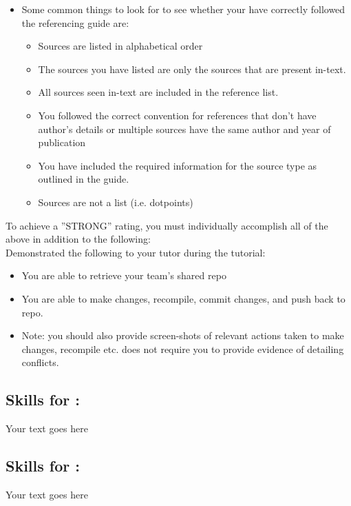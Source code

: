 \documentclass[a4paper, 11pt]{report}
\begin{document}
\begin{itemize}
\begin{itemize}
	\item Some common things to look for to see whether your have correctly followed the referencing guide are:
		\begin{itemize}
		\item Sources are listed in alphabetical order
		\item The sources you have listed are only the sources that are present in-text.
		\item All sources seen in-text are included in the reference list.
		\item You followed the correct convention for references that don’t have author’s details or multiple sources have the same author and year of publication
		\item You have included the required information for the source type as outlined in the guide.
		\item Sources are not a list (i.e. dotpoints)
		\end{itemize}
	\end{itemize}
\end{itemize}

To achieve a ''STRONG'' rating, you must individually accomplish all of the above in addition to the following:\\
Demonstrated the following to your tutor during the tutorial:
\begin{itemize}
\item You are able to retrieve your team’s shared repo
\item You are able to make changes, recompile, commit changes, and push back to repo.
\item Note: you should also provide screen-shots of relevant actions taken to make changes, recompile etc. does not require you to provide evidence of detailing conflicts.
\end{itemize}



\subsection{Skills for \majA: \studA}

Your text goes here

\subsection{Skills for \majB: \studB}

Your text goes here
\end{document}

